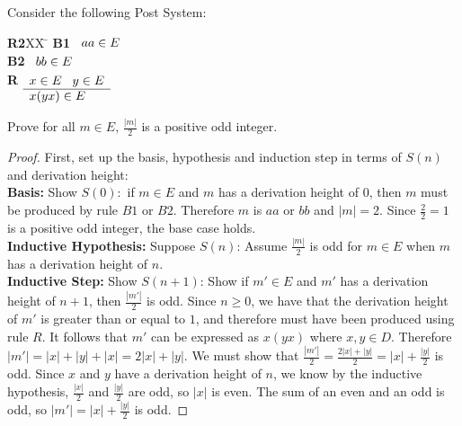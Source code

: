 \documentclass[]{exam}
\begin{document}
\begin{questions}
\question Consider the following Post System:
\begin{tabbing}
{\bf R2}XX \=  \kill
{\bf B1} \>
        \(\begin{array}[t]{l}
        aa \in E
        \end{array}\) \\[2ex]
{\bf B2} \>
        \(\begin{array}[t]{l}
        bb \in E
        \end{array}\) \\[2ex]
{\bf R} \>
        \(\begin{array}[t]{l}
        x \in E \;\;\;y \in E \\
        \hline
        x(yx) \in E
        \end{array}\) 
\end{tabbing}
Prove for all $m \in E$, $\frac{|m|}{2}$ is a positive odd integer.  
\begin{solution}
\begin{proof}
First, set up the basis, hypothesis and induction step in terms of $S(n)$ and
derivation height:
~\\
\textbf{Basis:} Show $S(0):$ if $m \in E$ and $m$ has a derivation height of
$0$, then $m$ must be produced by rule $B1$ or $B2$. Therefore $m$ is $aa$ or $bb$ 
and $|m| = 2$. Since $\frac{2}{2} = 1$ is a positive odd integer, the base
case holds.
~\\
\textbf{Inductive Hypothesis:} Suppose $S(n)$: Assume $\frac{|m|}{2}$ is odd
for $m \in E$ when $m$ has a derivation height of $n$.
~\\
\textbf{Inductive Step:} Show $S(n+1)$: Show if $m' \in E$ and $m'$ has a
derivation height of $n + 1$, then $\frac{|m'|}{2}$ is odd.  Since $n \geq 0$,
we have that the derivation height of $m'$ is greater than or equal to
$1$, and therefore must have been produced using rule $R$. It follows
that $m'$ can be expressed as $x(yx)$ where $x,y \in D$. Therefore $|m'| = |x| +
|y| + |x| = 2|x| + |y|$. We must show that $\frac{|m'|}{2} = \frac{2|x| + |y|}{2} = |x| +
\frac{|y|}{2}$ is odd.  Since $x$ and $y$ have a derivation height of $n$,
we know by the inductive hypothesis, $\frac{|x|}{2}$ 
and $\frac{|y|}{2}$ are odd, so $|x|$ is even. The sum of an even and
an odd is odd, so $|m'| = |x| + \frac{|y|}{2}$ is odd.
\end{proof}
\end{solution}
\end{questions}
\end{document}

